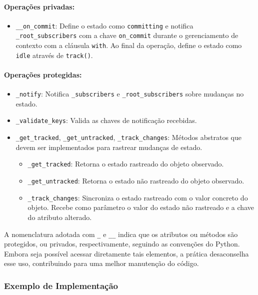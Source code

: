 \paragraph{Operações privadas:}
\begin{itemize}
    \item \texttt{\_\_on\_commit}: Define o estado como \texttt{committing} e notifica \texttt{\_root\_subscribers} com a chave \texttt{on\_commit} durante o gerenciamento de contexto com a cláusula \texttt{with}. Ao final da operação, define o estado como \texttt{idle} através de \texttt{track()}.
\end{itemize}

\paragraph{Operações protegidas:}
\begin{itemize}
    \item \texttt{\_notify}: Notifica \texttt{\_subscribers} e \texttt{\_root\_subscribers} sobre mudanças no estado.
    \item \texttt{\_validate\_keys}: Valida as chaves de notificação recebidas.
    \item \texttt{\_get\_tracked}, \texttt{\_get\_untracked}, \texttt{\_track\_changes}: Métodos abstratos que devem ser implementados para rastrear mudanças de estado.
    \begin{itemize}
        \item \texttt{\_get\_tracked}: Retorna o estado rastreado do objeto observado.
        \item \texttt{\_get\_untracked}: Retorna o estado não rastreado do objeto observado.
        \item \texttt{\_track\_changes}: Sincroniza o estado rastreado com o valor concreto do objeto. Recebe como parâmetro o valor do estado não rastreado e a chave do atributo alterado.
    \end{itemize}
\end{itemize}

A nomenclatura adotada com \texttt{\_} e \texttt{\_\_} indica que os atributos ou métodos são protegidos, ou privados, respectivamente, seguindo as convenções do Python. Embora seja possível acessar diretamente tais elementos, a prática desaconselha esse uso, contribuindo para uma melhor manutenção do código.

\subsubsection{Exemplo de Implementação}

